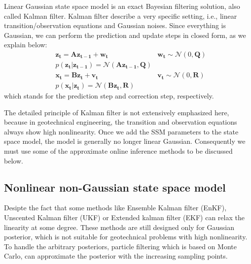 Linear Gaussian state space model is an exact Bayesian filtering solution, also called Kalman filter. Kalman filter describe a very specific setting, i.e., linear transition/observation equations and Gaussian noises. Since everything is Gaussian, we can perform the prediction and update steps in closed form,
 as we explain below:
\begin{equation}
\label{eq: Bayesian filtering}
\begin{aligned}
   & \boldsymbol{{z}_{t}}  =\boldsymbol{A} \boldsymbol{{z}_{t-1}}+\boldsymbol{w_{t}}  
  \ \ &\boldsymbol{w_{t}}   \sim \mathcal{N}\left(0, \boldsymbol{Q} \right) \\    
    &p(\boldsymbol{{z}_{t}}|\boldsymbol{{z}_{t-1}}) = \mathcal{N}(\boldsymbol{A} \boldsymbol{{z}_{t-1}},\boldsymbol{Q})    
    \\
     &\boldsymbol{{x}_{t}}=\boldsymbol{B} \boldsymbol{{z}_{t}}+\boldsymbol{v_{t}}  \ \ &\boldsymbol{v_{t}} \sim \mathcal{N}\left(0, \boldsymbol{R} \right)\\
     &p(\boldsymbol{{x}_{t}}|\boldsymbol{{z}_{t}}) = \mathcal{N}(\boldsymbol{B} \boldsymbol{{z}_{t}},\boldsymbol{R})   
\end{aligned}
\end{equation}
which stands for the prediction step and correction step, respectively.

The detailed principle of Kalman filter is not extensively emphasized here, because in geotechnical engineering, the transition and observation equations always show high nonlinearity. Once we add the SSM parameters to the state space model, the model is generally no longer linear Gaussian. Consequently
we must use some of the approximate online inference methods to be discussed below.

\subsection{Nonlinear non-Gaussian state space model}

Desipte the fact that some methods like Ensemble Kalman filter (EnKF), Unscented Kalman filter (UKF) or Extended kalman filter (EKF) can relax the linearity at some degree. These methods are still designed only for Gaussian posterior, which is not suitable for geotechnical problems with high nonlinearity. To handle the arbitrary posteriors, particle filtering which is based on Monte Carlo, can approximate the posterior with the increasing sampling points.




